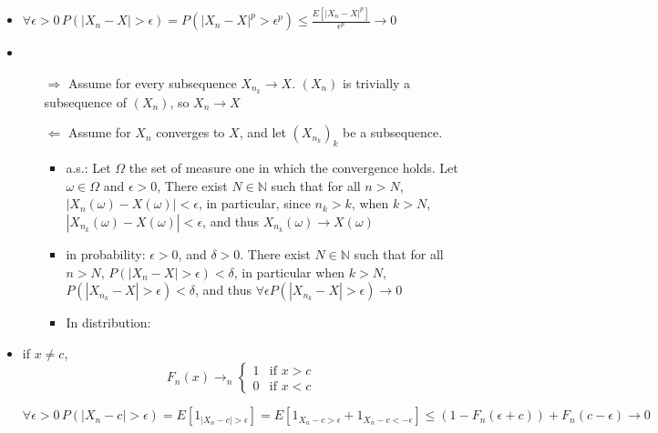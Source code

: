 \documentclass[12pt]{article}
\begin{document}
\begin{itemize}
\item $\forall \epsilon > 0 \, P(|X_n - X| > \epsilon) =  P(|X_n - X|^p > \epsilon^p)\le \frac{E[ |X_n - X|^p]}{\epsilon^p} \rightarrow 0$
\item
  \begin{itemize}
  \item[$\Rightarrow$] Assume for  every subsequence $X_{n_k} \rightarrow X$. $(X_n)$ is trivially a subsequence of $(X_n)$, so $X_n\rightarrow X$ 
  \item[$\Leftarrow$] Assume for  $X_n$ converges to $X$, and let $(X_{n_k})_k$ be a subsequence.
    \begin{itemize}
    \item a.s.:
      Let $\Omega$ the set of measure one in which the convergence holds.
      Let $\omega \in \Omega$ and $\epsilon > 0$, There exist $N \in \mathbb{N}$  such that for all $n > N$, $|X_n(\omega) - X(\omega)| < \epsilon$, in particular, since $n_k > k$, when
      $k > N$,  $|X_{n_k}(\omega) - X(\omega)| < \epsilon$,
      and thus $X_{n_k}(\omega) \rightarrow X(\omega)$
    \item in probability:
      $\epsilon > 0$, and $\delta > 0$. There exist $N \in \mathbb{N}$  such that for all $n > N$, $P(|X_n - X| > \epsilon) < \delta$, in particular when $k > N$, $P(|X_{n_k} - X| > \epsilon) < \delta$, and thus $\forall \epsilon P(|X_{n_k} - X| > \epsilon) \rightarrow 0$
    \item In distribution:
      
    \end{itemize}

    
  \end{itemize}
\item
  if $x \ne c$, \[ F_n(x) \rightarrow_n \left\{ \begin{array}{cc}1&\text{if $x > c$}\\0&\text{if $x < c$}\end{array} \right.\]
  
  $\forall \epsilon > 0 \, P(|X_n - c| > \epsilon) = E[1_{|X_n - c| > \epsilon}] = E[1_{X_n - c > \epsilon} + 1_{X_n - c < -\epsilon}] \le (1-F_n(\epsilon+c)) + F_n(c - \epsilon) \rightarrow 0$
\end{itemize}
\end{document}
